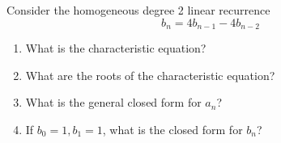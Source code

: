   Consider the homogeneous degree 2 linear recurrence
  \[
  b_n = 4b_{n-1} - 4b_{n-2}
  \]
  \begin{enumerate}[nosep,label=(\alph*)]
  \item What is the characteristic equation?
  \item What are the roots of the characteristic equation?
  \item What is the general closed form for $a_n$?
  \item If $b_0 = 1, b_1 = 1$, what is the closed form for $b_n$?
  \end{enumerate}
